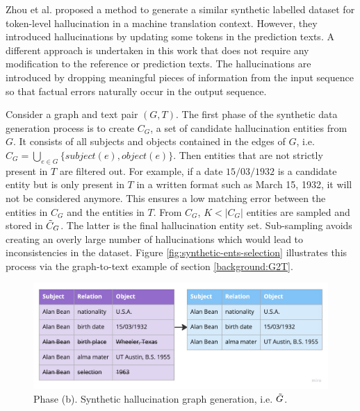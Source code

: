 Zhou et al.\cite{HallucationDetectionUsingSyntheticData} proposed a method to generate a similar synthetic labelled dataset for token-level hallucination in a machine translation context. However, they introduced hallucinations by updating some tokens in the prediction texts. A different approach is undertaken in this work that does not require any modification to the reference or prediction texts. The hallucinations are introduced by dropping meaningful pieces of information from the input sequence so that factual errors naturally occur in the output sequence. 


Consider a graph and text pair $(G, T)$. The first phase of the synthetic data generation process is to create $C_G$, a set of candidate hallucination entities from $G$. It consists of all subjects and objects contained in the edges of $G$, i.e. $C_{G} = \bigcup_{e \in G} \{subject(e), object(e)\}$. Then entities that are not strictly present in $T$ are filtered out. For example, if a date $15/03/1932$ is a candidate entity but is only present in $T$ in a written format such as March 15, 1932, it will not be considered anymore. This ensures a low matching error between the entities in $C_G$ and the entities in $T$. From $C_G$,  $K < |C_G|$ entities are sampled and stored in $\Tilde{C}_G$. The latter is the final hallucination entity set. Sub-sampling avoids creating an overly large number of hallucinations which would lead to inconsistencies in the dataset. Figure \ref{fig:synthetic-ents-selection} illustrates this process via the graph-to-text example of section \ref{background:G2T}.

\begin{figure}
    \centering
    \includegraphics[scale=0.2]{figures/design/synthetic/hallu_graph.jpg}
    \caption{Phase (b). Synthetic hallucination graph generation, i.e. $\Tilde{G}$.}
    \label{fig:synthetic-hallu-graph}
\end{figure}

